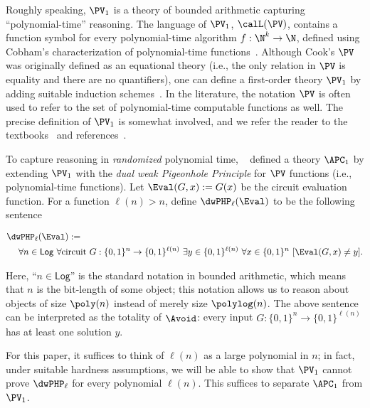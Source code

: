 Roughly speaking, $\PV_1$ is a theory of bounded arithmetic capturing ``polynomial-time'' reasoning. The language of $\PV_1$, $\calL(\PV)$, contains a function symbol for every polynomial-time algorithm $f: \N^k \to \N$, defined using Cobham's characterization of polynomial-time functions~\cite{cobham1964intrinsic}. Although Cook's $\PV$~\cite{Cook75} was originally defined as an equational theory (i.e., the only relation in $\PV$ is equality and there are no quantifiers), one can define a first-order theory $\PV_1$ by adding suitable induction schemes~\cite{Cook75, KRAJICEK1991143}. In the literature, the notation $\PV$ is often used to refer to the set of polynomial-time computable functions as well. The precise definition of $\PV_1$ is somewhat involved, and we refer the reader to the textbooks~\cite{Krajicek-book,Cook-Nguyen,Krajicek_proof_complexity} and references~\cite{Cook75,Jerabek06, ChenLiOliveira24, Li25}.

To capture reasoning in \emph{randomized} polynomial time, \Jerabek~\cite{Jerabek04,Jerabek-phd,Jerabek07} defined a theory $\APC_1$ by extending $\PV_1$ with the \emph{dual weak Pigeonhole Principle} for $\PV$ functions (i.e., polynomial-time functions). Let $\Eval(G,x):=G(x)$ be the circuit evaluation function. For a function $\ell(n) > n$, define $\dwPHP_\ell(\Eval)$ to be the following sentence

\begin{align*}
    &\dwPHP_\ell(\Eval):=\nonumber\nopagebreak\\
    &~~~~\forall n\in \mathsf{Log}~\forall\text{circuit }G:\{0,1\}^n\to \{0,1\}^{\ell(n)}~\exists y\in \{0,1\}^{\ell(n)}~\forall x\in \{0,1\}^n~[\Eval(G,x)\neq y]. 
\end{align*}

Here, ``$n\in\mathsf{Log}$'' is the standard notation in bounded arithmetic, which means that $n$ is the bit-length of some object; this notation allows us to reason about objects of size $\poly(n)$ instead of merely size $\polylog(n)$. The above sentence can be interpreted as the totality of $\Avoid$: every input $G: \{0, 1\}^n \to \{0, 1\}^{\ell(n)}$ has at least one solution $y$.

For this paper, it suffices to think of $\ell(n)$ as a large polynomial in $n$; in fact, under suitable hardness assumptions, we will be able to show that $\PV_1$ cannot prove $\dwPHP_\ell$ for every polynomial $\ell(n)$. This suffices to separate $\APC_1$ from $\PV_1$.



